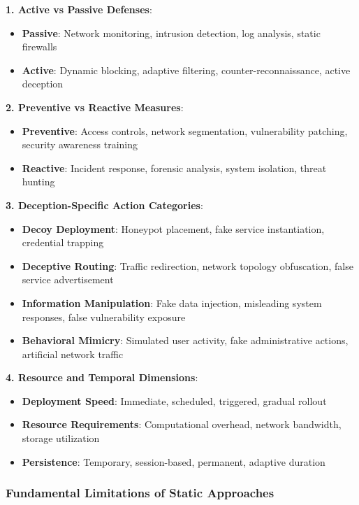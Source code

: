 \documentclass[12pt,oneside]{article}
\begin{document}
\textbf{1. Active vs Passive Defenses}:
\begin{itemize}
\item \textbf{Passive}: Network monitoring, intrusion detection, log analysis, static firewalls
\item \textbf{Active}: Dynamic blocking, adaptive filtering, counter-reconnaissance, active deception
\end{itemize}

\textbf{2. Preventive vs Reactive Measures}:
\begin{itemize}
\item \textbf{Preventive}: Access controls, network segmentation, vulnerability patching, security awareness training
\item \textbf{Reactive}: Incident response, forensic analysis, system isolation, threat hunting
\end{itemize}

\textbf{3. Deception-Specific Action Categories}:
\begin{itemize}
\item \textbf{Decoy Deployment}: Honeypot placement, fake service instantiation, credential trapping
\item \textbf{Deceptive Routing}: Traffic redirection, network topology obfuscation, false service advertisement
\item \textbf{Information Manipulation}: Fake data injection, misleading system responses, false vulnerability exposure
\item \textbf{Behavioral Mimicry}: Simulated user activity, fake administrative actions, artificial network traffic
\end{itemize}

\textbf{4. Resource and Temporal Dimensions}:
\begin{itemize}
\item \textbf{Deployment Speed}: Immediate, scheduled, triggered, gradual rollout
\item \textbf{Resource Requirements}: Computational overhead, network bandwidth, storage utilization
\item \textbf{Persistence}: Temporary, session-based, permanent, adaptive duration
\end{itemize}

\subsubsection{Fundamental Limitations of Static Approaches}
\end{document}

